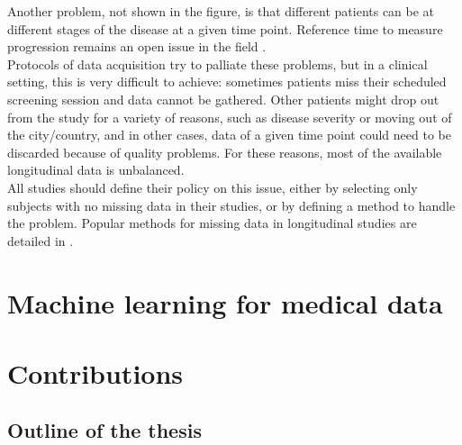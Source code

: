 Another problem, not shown in the figure, is that different patients can be at different stages of the disease at a given time point. Reference time to measure progression remains an open issue in the field \cite{Ashford2001}.  \\

Protocols of data acquisition try to palliate these problems, but in a clinical setting, this is very difficult to achieve: sometimes patients miss their scheduled screening session and data cannot be gathered. Other patients might drop out from the study for a variety of reasons, such as disease severity or moving out of the city/country, and in other cases, data of a given time point could need to be discarded because of quality problems. For these reasons, most of the available longitudinal data is unbalanced. \\

All studies should define their policy on this issue, either by selecting only subjects with no missing data in their studies, or by defining a method to handle the problem. Popular methods for missing data in longitudinal studies are detailed in \cite{Ibrahim}. \\

\section{Machine learning for medical data}



\section{Contributions}


\subsection{Outline of the thesis}

